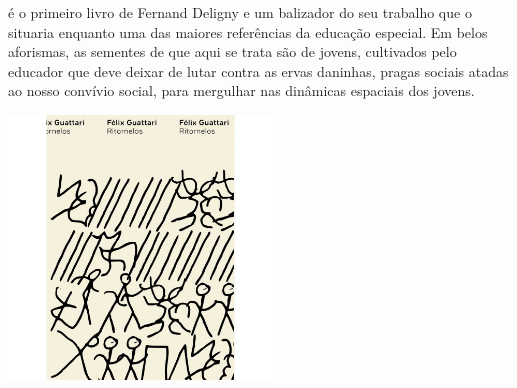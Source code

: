 \hspace*{-7cm}\hrulefill\hspace*{-7cm}

\medskip

 é o primeiro livro de Fernand Deligny e um balizador do seu trabalho que o situaria enquanto uma das maiores referências da educação especial. Em belos aforismas, as sementes de que aqui se trata são de jovens, cultivados pelo educador que deve deixar de lutar contra as ervas daninhas, pragas sociais atadas ao nosso convívio social, para mergulhar nas dinâmicas espaciais dos jovens.

\vfill

\hspace*{-.4cm}\begin{minipage}[c]{1\linewidth}
\small{
{}}
\end{minipage}

\pagebreak

\hspace{.5cm}

\begin{center}
\hspace*{-.5cm}\includegraphics[width=70mm]{./grid/guattari.jpeg}
\end{center}

\hspace*{-7cm}\hrulefill\hspace*{-7cm}

